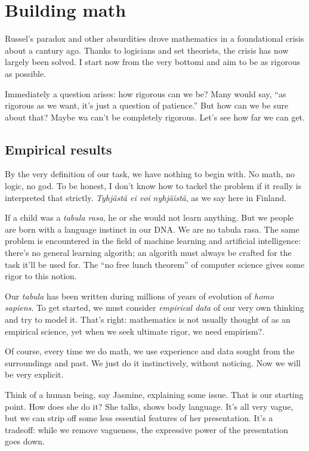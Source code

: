 \documentclass[11pt,oneside,%
]{memoir}
\theoremstyle{definition}
\begin{document}

\chapter{Building math}

Russel's paradox and other absurdities drove mathematics in a foundational crisis about a cantury ago. Thanks to logicians and set theorists, the crisis has now largely been solved. I start now from the very bottomi and aim to be as rigorous as possible.

Immediately a question arises: how rigorous can we be? Many would say, ``as rigorous as we want, it's just a question of patience.'' But how can we be sure about that? Maybe wa can't be completely rigorous. Let's see how far we can get.

\section{Empirical results}

By the very definition of our task, we have nothing to begin with. No math, no logic, no god. To be honest, I don't know how to tackel the problem if it really is interpreted that strictly. \emph{Tyhjästä ei voi nyhjäistä}, as we say here in Finland.

If a child was a \emph{tabula rasa}, he or she would not learn anything. But we people are born with a language instinct in our DNA. We are no tabula rasa. The same problem is encountered in the field of machine learning and artificial intelligence: there's no general learning algorith; an algorith must always be crafted for the task it'll be used for. The ``no free lunch theorem'' of computer science gives some rigor to this notion.

Our \emph{tabula} has been written during millions of years of evolution of \emph{homo sapiens}. To get started, we must consider \emph{empirical data} of our very own thinking and try to model it. That's right: mathematics is not usually thought of as an empirical science, yet when we seek ultimate rigor, we need empirism?.

Of course, every time we do math, we use experience and data sought from the surroundings and past. We just do it instinctively, without noticing. Now we will be very explicit.

Think of a human being, say Jasmine, explaining some issue. That is our starting point. How does she do it? She talks, shows body language. It's all very vague, but we can strip off some less essential features of her presentation. It's a tradeoff: while we remove vagueness, the expressive power of the presentation goes down.
\end{document}
